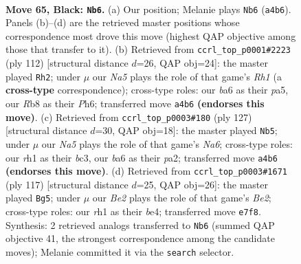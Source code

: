 \documentclass[11pt]{article}
\begin{document}
\clearpage

\begin{figure}[p]\centering
\begin{subfigure}{0.46\textwidth}\centering
\resizebox{\linewidth}{!}{%
\newchessgame
\chessboard[
  setfen={1r6/4b3/B2p2kp/B3p3/n3P2p/5P2/5K2/7R b - - 0 65},
  showmover=false,
  pgfstyle=straightmove, color=movearrow, markmove={a4-b6}
]}
\caption{}
\end{subfigure}\hfill
\begin{subfigure}{0.46\textwidth}\centering
\resizebox{\linewidth}{!}{%
\newchessgame
\chessboard[
  setfen={3r4/8/4pk1P/ppr5/4B3/P4P2/1KP5/7R w - - 24 57},
  showmover=false,
  pgfstyle=straightmove, color=movearrow, markmove={h1-h2}
]}
\caption{}
\end{subfigure}
\\[4pt]
\begin{subfigure}{0.46\textwidth}\centering
\resizebox{\linewidth}{!}{%
\newchessgame
\chessboard[
  setfen={4R3/6pk/7p/3B4/7P/n1Bb2KP/P3p3/5r2 b - - 7 64},
  showmover=false,
  pgfstyle=straightmove, color=movearrow, markmove={a3-b5}
]}
\caption{}
\end{subfigure}\hfill
\begin{subfigure}{0.46\textwidth}\centering
\resizebox{\linewidth}{!}{%
\newchessgame
\chessboard[
  setfen={7R/kp2b1r1/p7/8/P1K1B2p/2P5/1P6/8 b - - 12 59},
  showmover=false,
  pgfstyle=straightmove, color=movearrow, markmove={e7-g5}
]}
\caption{}
\end{subfigure}
\caption{\textbf{Move 65, Black: \texttt{Nb6}.} (a) Our position; Melanie plays \texttt{Nb6} (\texttt{a4b6}). Panels (b)--(d) are the retrieved master positions whose correspondence most drove this move (highest QAP objective among those that transfer to it). (b) Retrieved from \texttt{ccrl\_top\_p0001\#2223} (ply 112) [structural distance $d$=26, QAP obj=24]: the master played \texttt{Rh2}; under $\mu$ our \emph{Na5} plays the role of that game's \emph{Rh1} (a \textbf{cross-type} correspondence); cross-type roles: our \emph{b}a6 as their \emph{p}a5, our \emph{R}b8 as their \emph{P}h6; transferred move \texttt{a4b6} \textbf{(endorses this move)}. (c) Retrieved from \texttt{ccrl\_top\_p0003\#180} (ply 127) [structural distance $d$=30, QAP obj=18]: the master played \texttt{Nb5}; under $\mu$ our \emph{Na5} plays the role of that game's \emph{Na6}; cross-type roles: our \emph{r}h1 as their \emph{b}c3, our \emph{b}a6 as their \emph{p}a2; transferred move \texttt{a4b6} \textbf{(endorses this move)}. (d) Retrieved from \texttt{ccrl\_top\_p0003\#1671} (ply 117) [structural distance $d$=25, QAP obj=26]: the master played \texttt{Bg5}; under $\mu$ our \emph{Be2} plays the role of that game's \emph{Be2}; cross-type roles: our \emph{r}h1 as their \emph{b}e4; transferred move \texttt{e7f8}. Synthesis: 2 retrieved analogs transferred to \texttt{Nb6} (summed QAP objective 41, the strongest correspondence among the candidate moves); Melanie committed it via the \texttt{search} selector.}
\label{fig:thought-m129}
\end{figure}
\end{document}
